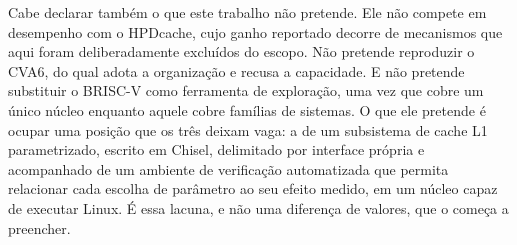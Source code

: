 Cabe declarar também o que este trabalho não pretende. Ele não compete em desempenho com o HPDcache, cujo ganho reportado decorre de mecanismos que aqui foram deliberadamente excluídos do escopo. Não pretende reproduzir o CVA6, do qual adota a organização e recusa a capacidade. E não pretende substituir o BRISC-V como ferramenta de exploração, uma vez que cobre um único núcleo enquanto aquele cobre famílias de sistemas. O que ele pretende é ocupar uma posição que os três deixam vaga: a de um subsistema de cache L1 parametrizado, escrito em Chisel, delimitado por interface própria e acompanhado de um ambiente de verificação automatizada que permita relacionar cada escolha de parâmetro ao seu efeito medido, em um núcleo capaz de executar Linux. É essa lacuna, e não uma diferença de valores, que o  começa a preencher.
